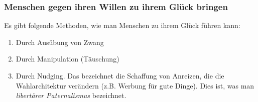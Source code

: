 \documentclass[../main.tex]{subfiles}
\begin{document}
\subsubsection{Menschen gegen ihren Willen zu ihrem Glück bringen}
Es gibt folgende Methoden, wie man Menschen zu ihrem Glück führen kann:
\begin{enumerate}[label=(\alph*)]
	\item Durch Ausübung von Zwang
	\item Durch Manipulation (Täuschung)
	\item Durch Nudging. Das bezeichnet die Schaffung von Anreizen, die die Wahlarchitektur verändern (z.B. Werbung für gute Dinge). Dies ist, was man \textit{libertärer Paternalismus} bezeichnet. 
\end{enumerate}
\end{document}
